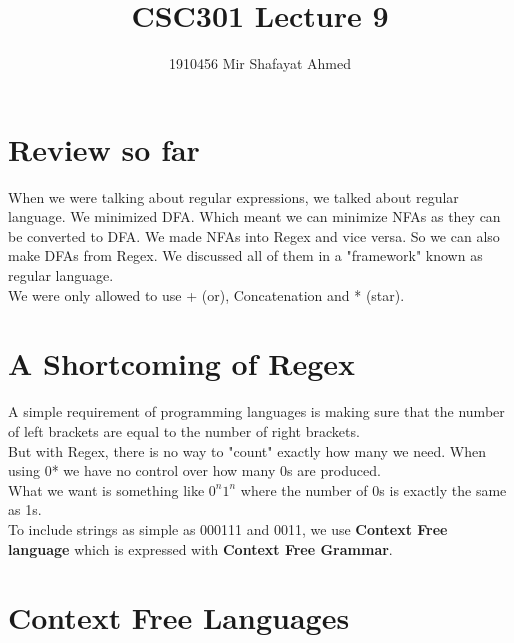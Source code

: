 \documentclass{article}
\title{CSC301 Lecture 9}
\author{1910456 Mir Shafayat Ahmed}
\begin{document}
    \pagecolor[HTML]{FFFFCC}
    \maketitle
    \section*{Review so far}
    When we were talking about regular expressions, we talked about regular language. We minimized DFA. Which meant we can minimize NFAs as they can be converted to DFA. We made NFAs into Regex and vice versa. So we can also make DFAs from Regex.
    We discussed all of them in a "framework" known as regular language.
    \\
    We were only allowed to use + (or), Concatenation and * (star).
    \section*{A Shortcoming of Regex} 
    A simple requirement of programming languages is making sure that the number of left brackets are equal to the number of right brackets.
    \\
    But with Regex, there is no way to "count" exactly how many we need. When using 0* we have no control over how many 0s are produced.
    \\
    What we want is something like $0^n1^n$ where the number of 0s is exactly the same as 1s.
    \\
    To include strings as simple as 000111 and 0011, we use \textbf{Context Free language} which is expressed with \textbf{Context Free Grammar}.
    \section*{Context Free Languages}
\end{document}
